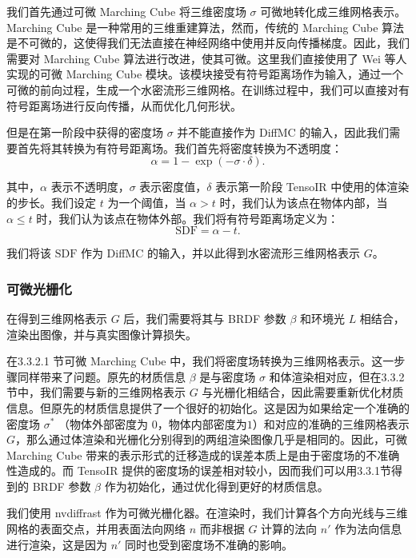 我们首先通过可微 Marching Cube 将三维密度场 $\sigma$ 可微地转化成三维网格表示。Marching Cube 是一种常用的三维重建算法，然而，传统的 Marching Cube 算法 \cite{MarchingCube} 是不可微的，这使得我们无法直接在神经网络中使用并反向传播梯度。因此，我们需要对 Marching Cube 算法进行改进，使其可微。这里我们直接使用了 Wei 等人实现的可微 Marching Cube 模块。该模块接受有符号距离场作为输入，通过一个可微的前向过程，生成一个水密流形三维网格。在训练过程中，我们可以直接对有符号距离场进行反向传播，从而优化几何形状。

但是在第一阶段中获得的密度场 $\sigma$ 并不能直接作为 DiffMC 的输入，因此我们需要首先将其转换为有符号距离场。我们首先将密度转换为不透明度：
\begin{equation}
  \alpha = 1 - \exp(-\sigma \cdot \delta).
\end{equation}

其中，$\alpha$ 表示不透明度，$\sigma$ 表示密度值，$\delta$ 表示第一阶段 TensoIR 中使用的体渲染的步长。我们设定 $t$ 为一个阈值，当 $\alpha > t$ 时，我们认为该点在物体内部，当 $\alpha \leq t$ 时，我们认为该点在物体外部。我们将有符号距离场定义为：
\begin{equation}
  \text{SDF} = \alpha - t.
\end{equation}

我们将该 $\text{SDF}$ 作为 DiffMC 的输入，并以此得到水密流形三维网格表示 $G$。

\subsubsection{可微光栅化}

在得到三维网格表示 $G$ 后，我们需要将其与 BRDF 参数 $\beta$ 和环境光 $L$ 相结合，渲染出图像，并与真实图像计算损失。

在3.3.2.1 节可微 Marching Cube 中，我们将密度场转换为三维网格表示。这一步骤同样带来了问题。原先的材质信息 $\beta$ 是与密度场 $\sigma$ 和体渲染相对应，但在3.3.2节中，我们需要与新的三维网格表示 $G$ 与光栅化相结合，因此需要重新优化材质信息。但原先的材质信息提供了一个很好的初始化。这是因为如果给定一个准确的密度场 $\sigma^*$ （物体外部密度为 $0$，物体内部密度为$1$）和对应的准确的三维网格表示 $G$，那么通过体渲染和光栅化分别得到的两组渲染图像几乎是相同的。因此，可微 Marching Cube 带来的表示形式的迁移造成的误差本质上是由于密度场的不准确性造成的。而 TensoIR 提供的密度场的误差相对较小，因而我们可以用3.3.1节得到的 BRDF 参数 $\beta$ 作为初始化，通过优化得到更好的材质信息。

我们使用 nvdiffrast \cite{nvdiffrast} 作为可微光栅化器。在渲染时，我们计算各个方向光线与三维网格的表面交点，并用表面法向网络 $n$ 而非根据 $G$ 计算的法向 $n'$ 作为法向信息进行渲染，这是因为 $n'$ 同时也受到密度场不准确的影响。

